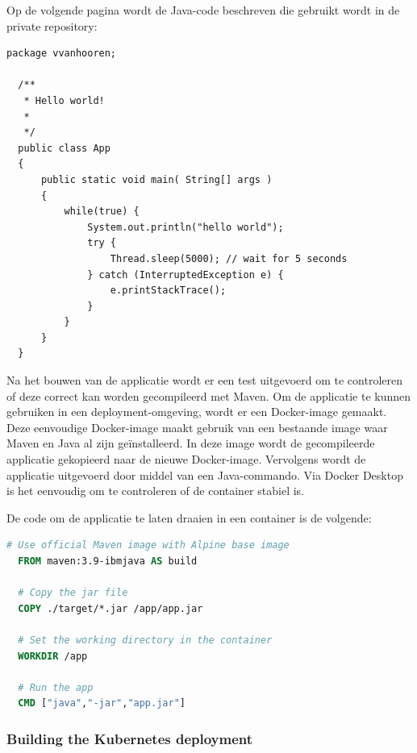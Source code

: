 Op de volgende pagina wordt de Java-code beschreven die gebruikt wordt in de private repository:
\clearpage

\begin{lstlisting}
package vvanhooren;

  /**
   * Hello world!
   *
   */
  public class App 
  {
      public static void main( String[] args )
      {
          while(true) {
              System.out.println("hello world");
              try {
                  Thread.sleep(5000); // wait for 5 seconds
              } catch (InterruptedException e) {
                  e.printStackTrace();
              }
          }
      }
  }
\end{lstlisting}

\vspace{0.5cm}
Na het bouwen van de applicatie wordt er een test uitgevoerd om te controleren of deze correct kan worden gecompileerd met Maven. Om de applicatie te kunnen gebruiken in een deployment-omgeving, wordt er een Docker-image gemaakt. Deze eenvoudige Docker-image maakt gebruik van een bestaande image waar Maven en Java al zijn geïnstalleerd. In deze image wordt de gecompileerde applicatie gekopieerd naar de nieuwe Docker-image. Vervolgens wordt de applicatie uitgevoerd door middel van een Java-commando. Via Docker Desktop is het eenvoudig om te controleren of de container stabiel is.
\newline

De code om de applicatie te laten draaien in een container is de volgende:
\newline

\begin{lstlisting}[style=dockerfile,language=Dockerfile]
  # Use official Maven image with Alpine base image
  FROM maven:3.9-ibmjava AS build
  
  # Copy the jar file 
  COPY ./target/*.jar /app/app.jar
  
  # Set the working directory in the container
  WORKDIR /app
  
  # Run the app
  CMD ["java","-jar","app.jar"]
\end{lstlisting}

\clearpage
\subsubsection{
{Building the Kubernetes deployment}}
\label{sec:Bouwen van de Kubernetes deployment}

